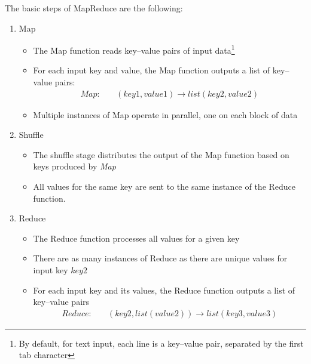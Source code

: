 The basic steps of MapReduce are the following:

\begin{enumerate}
\item Map
\begin{itemize}
   \item The Map function reads key--value pairs of input data\footnote{By default, for text input, each line is a key--value pair, separated by the first tab character}
   \item For each input key and value, the Map function outputs a list of key--value pairs:
\begin{align*}
Map: &\quad(key1, value1) \rightarrow list(key2, value2)
\end{align*}
   \item Multiple instances of Map operate in parallel, one on each block of data
\end{itemize}
\item Shuffle
\begin{itemize}
   \item The shuffle stage distributes the output of the Map function based on keys produced by \emph{Map}
   \item All values for the same key are sent to the same instance of the Reduce function. 
\end{itemize}
\item Reduce
\begin{itemize}
   \item The Reduce function processes all values for a given key
   \item There are as many instances of Reduce as there are unique values for input key $key2$
   \item For each input key and its values, the Reduce function outputs a list of key--value pairs
\begin{align*}
Reduce: &\quad(key2, list(value2)) \rightarrow list(key3, value3)
\end{align*}
\end{itemize}
\end{enumerate}


